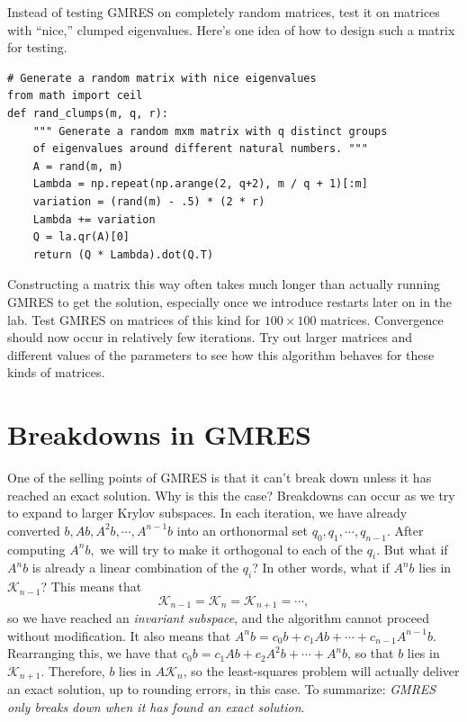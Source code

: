 \begin{problem}
Instead of testing GMRES on completely random matrices, test it on matrices with ``nice,'' clumped eigenvalues.
Here's one idea of how to design such a matrix for testing.
\begin{lstlisting}
# Generate a random matrix with nice eigenvalues
from math import ceil
def rand_clumps(m, q, r):
    """ Generate a random mxm matrix with q distinct groups
    of eigenvalues around different natural numbers. """
    A = rand(m, m)
    Lambda = np.repeat(np.arange(2, q+2), m / q + 1)[:m]
    variation = (rand(m) - .5) * (2 * r)
    Lambda += variation
    Q = la.qr(A)[0]
    return (Q * Lambda).dot(Q.T)
\end{lstlisting}
Constructing a matrix this way often takes much longer than actually running GMRES to get the solution, especially once we
introduce restarts later on in the lab.
Test GMRES on matrices of this kind for $100\times 100$ matrices.
Convergence should now occur in relatively few iterations.
Try out larger matrices and different values of the parameters to see how this algorithm behaves for these kinds of matrices.
\label{prob:GMRESClumps}
\end{problem}

\section*{Breakdowns in GMRES}
One of the selling points of GMRES is that it can't break down unless it has reached an exact solution.
Why is this the case?
Breakdowns can occur as we try to expand to larger Krylov subspaces.
In each iteration, we have already converted $b,Ab,A^{2}b,\cdots, A^{n-1}b$ into an orthonormal set $q_0,q_1,\cdots,q_{n-1}$.
After computing $A^nb,$ we will try to make it orthogonal to each of the $q_i$.
But what if $A^{n}b$ is already a linear combination of the $q_i$? In other words, what if $A^{n}b$ lies in $\mathcal{K}_{n-1}$?
This means that
\[
\mathcal{K}_{n-1}=\mathcal{K}_n=\mathcal{K}_{n+1}=\cdots,
\]
so we have reached an \emph{invariant subspace},
and the algorithm cannot proceed without modification.
It also means that $A^{n}b = c_0 b + c_1 A b + \cdots + c_{n-1}A^{n-1}b$.
Rearranging this, we have that $c_0 b = c_1 A b + c_2 A^{2} b + \cdots + A^{n}b$, so that $b$ lies in $\mathcal{K}_{n+1}$.
Therefore, $b$ lies in $A\mathcal{K}_n$, so the least-squares problem will actually deliver an exact solution, up to rounding errors,
in this case.
To summarize: \emph{GMRES only breaks down when it has found an exact solution}.

